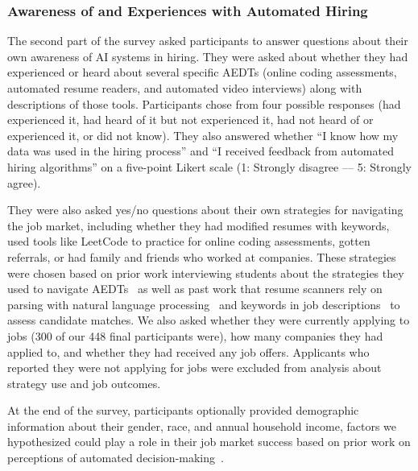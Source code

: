 \subsubsection{Awareness of and Experiences with Automated Hiring}
The second part of the survey asked participants to answer questions about their own awareness of AI systems in hiring. They were asked about whether they had experienced or heard about several specific AEDTs (online coding assessments, automated resume readers, and automated video interviews) along with descriptions of those tools. Participants chose from four possible responses (had experienced it, had heard of it but not experienced it, had not heard of or experienced it, or did not know). They also answered whether ``I know how my data was used in the hiring process'' and ``I received feedback from automated hiring algorithms'' on a five-point Likert scale (1: Strongly disagree --- 5: Strongly agree).

They were also asked yes/no questions about their own strategies for navigating the job market, including whether they had modified resumes with keywords, used tools like LeetCode to practice for online coding assessments, gotten referrals, or had family and friends who worked at companies. These strategies were chosen based on prior work interviewing students about the strategies they used to navigate AEDTs~\cite{armstrong2023navigating} as well as past work that resume scanners rely on parsing with natural language processing~\cite{sanyal2017resume, harsha2022automated, bharadwaj2022resume} and keywords in job descriptions~\cite{dhende2018candidate, rhea2022resume, satheesh2020resume} to assess candidate matches. We also asked whether they were currently applying to jobs (300 of our 448 final participants were), how many companies they had applied to, and whether they had received any job offers. Applicants who reported they were not applying for jobs were excluded from analysis about strategy use and job outcomes.

At the end of the survey, participants optionally provided demographic information about their gender, race, and annual household income, factors we hypothesized could play a role in their job market success based on prior work on perceptions of automated decision-making~\cite{lee2018understanding, wang2020factors}. 